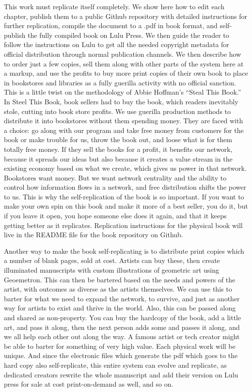This work must replicate itself completely.  We show here how to edit each chapter, publish them to a public Github repository with detailed instructions for further replication, compile the document to a .pdf in book format, and self-publish the fully compiled book on Lulu Press. We then guide the reader to follow the instructions on Lulu to get all the needed copyright metadata for official distribution through normal publication channels.  We then describe how to order just a few copies, sell them along with other parts of the system here at a markup, and use the profits to buy more print copies of their own book to place in bookstores and libraries as a fully guerilla activity with no official sanction.  This is a little twist on the methodology of Abbie Hoffman's ``Steal This Book.''  In Steel This Book, book sellers had to buy the book, which readers inevitably stole, cutting into book store profits.  We use guerilla production methods to distribute it into bookstores without them spending money.  They are faced with a choice: go along with our program and take free money from customers for the book or make trouble for us, throw the book out, and loose what is for them totally free money.  If they sell the books for a profit, it benefits our network, because it spreads our ideas but also because it creates a value stream in the existing economy based on what we create, which gives us power in that network.   Bookstores want money.  But we want network centrality and the ability to control how information flows in a network, and free distribution shifts the power to us.  This is why the self-replication of the book is so important.  If you want to make your own spin on this book and make it more of a best seller, you do it, but if you leave it open, you hope someone else does it again, and that it keeps getting better as it replicates.  Replication instructions for the physical book will live in the README file for the book repository on Github.

Another way to make the book self-replicating is to distribute print copies which a number of blank pages, sold at cost.  Artists can buy these, then create illuminated manuscripts with custom illustrations of geometric art using Geoemetron.  This can then be bartered based on the needs and powers of the artist, with outcomes as diverse as the artists themselves.  We can use this to barter for what we need to expand the network, to survive, and just as another way for artists to exist and thrive in the world.  Also, this can be passed along and shared as non-property.  You can buy the hardcopy of the book, add a little art, and pass it along, then the next person adds some and passes it along, and we all help each other out along the way.  A famous artist or tech creator might be able to barter for something of very high value.  Each physical work will be unique.  And since the electronic files which generate the pdf which goes to the hard copy also self-replicate, this entire system can evolve and replicate, as dedicated creators rewrite the whole manuscript and add their version on Lulu press for sale at cost print-on-demand as well, and so on.

